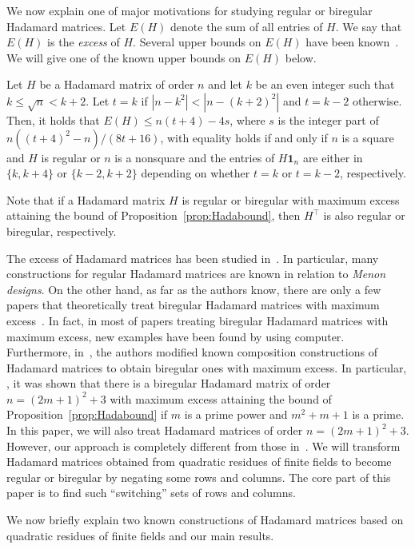 \documentclass[ALCO,ThmDefs,Unicode]{cedram}
\newcommand*\tra{\top}
\newcommand*{\un}{\mathbf{1}}
\begin{document}
We now explain one of major motivations for studying regular or biregular Hadamard matrices. Let $E(H)$ denote the sum of all entries of $H$. We say that $E(H)$ is the \emph{excess} of $H$. Several upper bounds on $E(H)$ have been known~\cite{B,HLS,KF}. We will give one of the known upper bounds on $E(H)$ below.

\begin{prop} \label{prop:Hadabound}
Let $H$ be a Hadamard matrix of order $n$ and let $k$ be an even integer such that $k\le \sqrt{n}<k+2$. Let $t=k$ if $|n-k^2|<|n-(k+2)^2|$ and $t=k-2$ otherwise. Then, it holds that $E(H)\leq n(t+4)-4s$, where $s$ is the integer part of $n((t+4)^2-n)/(8t+16)$, with equality holds if and only if $n$ is a square and $H$ is regular or $n$ is a nonsquare and the entries of $H\un_n$ are either in $\{k,k+4\}$ or $\{k-2,k+2\}$ depending on whether $t=k$ or $t=k-2$, respectively.
\end{prop}

Note that if a Hadamard matrix $H$ is regular or biregular with maximum excess attaining the bound of Proposition~\ref{prop:Hadabound}, then $H^\tra$ is also regular or biregular, respectively.

The excess of Hadamard matrices has been studied in~\cite{B,CK,FK,HK,HKL,K,KK,KKS,KS,KF,S,XXS}. In particular, many constructions for regular Hadamard matrices are known in relation to \emph{Menon designs}. On the other hand, as far as the authors know, there are only a few papers that theoretically treat biregular Hadamard matrices with maximum excess~\cite{K,KKS}. In fact, in most of papers treating biregular Hadamard matrices with maximum excess, new examples have been found by using computer. Furthermore, in~\cite{K,KKS}, the authors modified known composition constructions of Hadamard matrices to obtain biregular ones with maximum excess. In particular, \cite{KKS}, it was shown that there is a biregular Hadamard matrix of order $n=(2m+1)^2+3$ with maximum excess attaining the bound of Proposition~\ref{prop:Hadabound} if $m$ is a prime power and $m^2+m+1$ is a prime. In this paper, we will also treat Hadamard matrices of order $n=(2m+1)^2+3$. However, our approach is completely different from those in~\cite{K,KKS}. We will transform Hadamard matrices obtained from quadratic residues of finite fields to become regular or biregular by negating some rows and columns. The core part of this paper is to find such ``switching'' sets of rows and columns.

We now briefly explain two known constructions of Hadamard matrices based on quadratic residues of finite fields and our main results.
\end{document}
